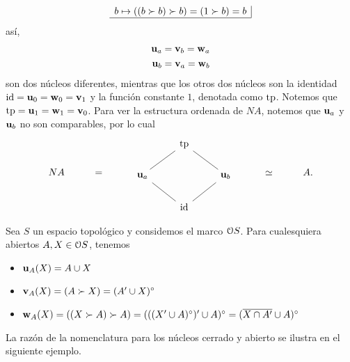 \begin{example}
\[\begin{array}{c|}
          b\mapsto ((b\succ b)\succ b) = (1\succ b) = b \\
          \hline
      \end{array}
  \]
  así,
  \begin{align*}
      \unuc a = \vnuc b = \wnuc a \\
      \unuc b = \vnuc a = \wnuc b
  \end{align*}
  son dos núcleos diferentes, mientras que
  los otros dos núcleos son la identidad $\id=\unuc 0=\wnuc
  0=\vnuc 1$ y la función constante $1$, denotada como $\tp$.
  Notemos que $\tp=\unuc 1=\wnuc 1=\vnuc 0$.
  Para ver la estructura ordenada de $NA$, notemos que
  $\unuc a$ y $\unuc b$ no son comparables, por lo cual
  \[
    NA\hspace{10mm} = \hspace{10mm}
    \begin{tikzcd}
      & \tp \\
      \unuc a \ar[ur,no head] && \unuc b \ar[ul,no head] \\
      & \id \ar[ur,no head] \ar[ul,no head]
    \end{tikzcd}
    \hspace{10mm} \simeq \hspace{10mm} A
  .\]
\end{example}

\begin{example}%
Sea $S$ un espacio topológico y considemos el marco $\cal O S$.
Para cualesquiera abiertos $A,X\in \cal OS$, tenemos
  \begin{itemize}
    \item $\unuc A(X)=A\cup X$
    \item $\vnuc A(X)=(A\succ X)=(A'\cup X)^\circ$
    \item
      $\wnuc A(X)
      =((X\succ A)\succ A)
      =(((X'\cup A)^\circ)'\cup A)^\circ
      =(\ol{X\cap A'}\cup A)^\circ$
  \end{itemize}
\end{example}

La razón de la nomenclatura para los núcleos cerrado y abierto se
ilustra en el siguiente ejemplo.

